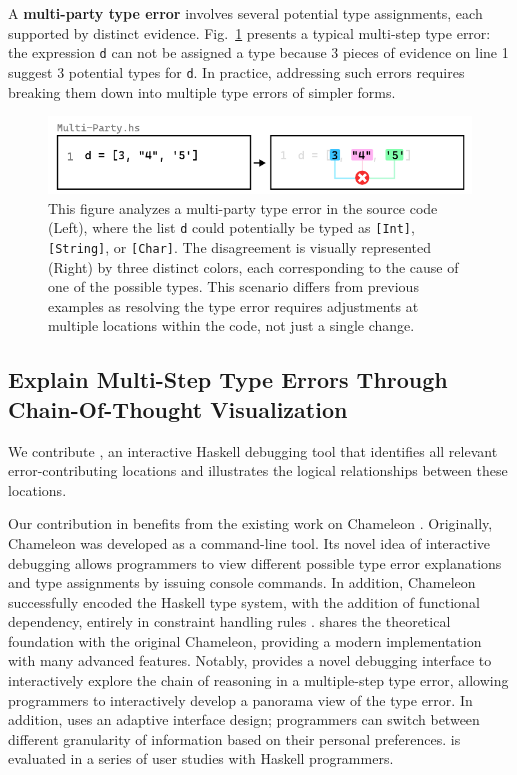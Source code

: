 A \textbf{multi-party type error} involves several potential type assignments, each supported by distinct evidence.  Fig.~\ref{fig:multi-party-example} presents a typical multi-step type error: the expression \texttt{d} can not be assigned a type because 3 pieces of evidence on line 1 suggest 3 potential types for \texttt{d}. In practice, addressing such errors requires breaking them down into multiple type errors of simpler forms.


\begin{figure}[htbp]
\centering  \includegraphics[width=\linewidth]{Multi-Party}
  \caption[This illustration depicts a multi-party type error in Haskell]{
    \label{fig:multi-party-example}
    This figure analyzes a multi-party type error in the source code (Left), where the list \texttt{d} could potentially be typed as \texttt{[Int]}, \texttt{[String]}, or \texttt{[Char]}. The disagreement is visually represented (Right) by three distinct colors, each corresponding to the cause of one of the possible types. This scenario differs from previous examples as resolving the type error requires adjustments at multiple locations within the code, not just a single change.
       }
\end{figure}



\subsection*{Explain Multi-Step Type Errors Through Chain-Of-Thought Visualization}


We contribute \textbf{\chameleon{}}, an interactive Haskell debugging tool that identifies all relevant error-contributing locations and illustrates the logical relationships between these locations. 


Our contribution in \chameleon{} benefits from the existing work on Chameleon \cite{Stuckey2003-pz, Wazny2006-ll}. Originally,  Chameleon was developed as a command-line tool. Its novel idea of interactive debugging allows programmers to view different possible type error explanations and type assignments by issuing console commands. In addition, Chameleon successfully encoded the Haskell type system, with the addition of functional dependency, entirely in constraint handling rules \cite{Fruhwirth1998-jq}. \chameleon{} shares the theoretical foundation with the original Chameleon, providing a modern implementation with many advanced features. Notably, \chameleon{} provides a novel debugging interface to interactively explore the chain of reasoning in a multiple-step type error, allowing programmers to interactively develop a panorama view of the type error. In addition, \chameleon{} uses an adaptive interface design; programmers can switch between different granularity of information based on their personal preferences. \chameleon{} is evaluated in a series of user studies with Haskell programmers.




